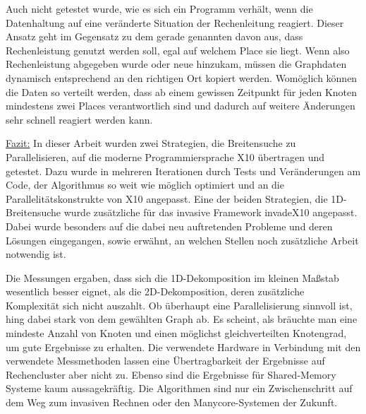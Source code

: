 Auch nicht getestet wurde, wie es sich ein Programm verhält, wenn die Datenhaltung auf eine veränderte Situation der Rechenleitung reagiert. Dieser Ansatz geht im Gegensatz zu dem gerade genannten davon aus, dass Rechenleistung genutzt werden soll, egal auf welchem Place sie liegt. Wenn also Rechenleistung abgegeben wurde oder neue hinzukam, müssen die Graphdaten dynamisch entsprechend an den richtigen Ort kopiert werden. Womöglich können die Daten so verteilt werden, dass ab einem gewissen Zeitpunkt für jeden Knoten mindestens zwei Places verantwortlich sind und dadurch auf weitere Änderungen sehr schnell reagiert werden kann.

\underline{Fazit:}
In dieser Arbeit wurden zwei Strategien, die Breitensuche zu Parallelisieren, auf die moderne Programmiersprache X10 übertragen und getestet. Dazu wurde in mehreren Iterationen durch Tests und Veränderungen am Code, der Algorithmus so weit wie möglich optimiert und an die Parallelitätskonstrukte von X10 angepasst. Eine der beiden Strategien, die 1D-Breitensuche wurde zusätzliche für das invasive Framework invadeX10 angepasst. Dabei wurde besonders auf die dabei neu auftretenden Probleme und deren Lösungen eingegangen, sowie erwähnt, an welchen Stellen noch zusätzliche Arbeit notwendig ist.

Die Messungen ergaben, dass sich die 1D-Dekomposition im kleinen Maßstab wesentlich besser eignet, als die 2D-Dekomposition, deren zusätzliche Komplexität sich nicht auszahlt. Ob überhaupt eine Parallelisierung sinnvoll ist, hing dabei stark von dem gewählten Graph ab. Es scheint, als bräuchte man eine mindeste Anzahl von Knoten und einen möglichst gleichverteilten Knotengrad, um gute Ergebnisse zu erhalten. Die verwendete Hardware in Verbindung mit den verwendete Messmethoden lassen eine Übertragbarkeit der Ergebnisse auf Rechencluster aber nicht zu. Ebenso sind die Ergebnisse für Shared-Memory Systeme kaum aussagekräftig. Die Algorithmen sind nur ein Zwischenschritt auf dem Weg zum invasiven Rechnen oder den Manycore-Systemen der Zukunft.


